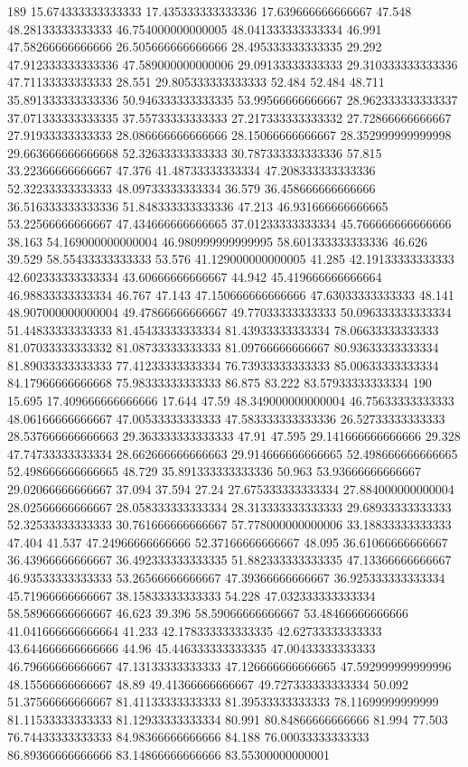189 15.674333333333333 17.435333333333336 17.639666666666667 47.548 48.28133333333333 46.754000000000005 48.041333333333334 46.991 47.58266666666666 26.505666666666666 28.495333333333335 29.292 47.912333333333336 47.589000000000006 29.09133333333333 29.310333333333336 47.71133333333333 28.551 29.805333333333333 52.484 52.484 48.711 35.891333333333336 50.946333333333335 53.99566666666667 28.962333333333337 37.071333333333335 37.55733333333333 27.217333333333332 27.72866666666667 27.91933333333333 28.086666666666666 28.15066666666667 28.352999999999998 29.663666666666668 52.32633333333333 30.787333333333336 57.815 33.22366666666667 47.376 41.48733333333334 47.208333333333336 52.32233333333333 48.09733333333334 36.579 36.458666666666666 36.516333333333336 51.848333333333336 47.213 46.931666666666665 53.22566666666667 47.434666666666665 37.01233333333334 45.766666666666666 38.163 54.169000000000004 46.980999999999995 58.601333333333336 46.626 39.529 58.55433333333333 53.576 41.129000000000005 41.285 42.19133333333333 42.602333333333334 43.60666666666667 44.942 45.419666666666664 46.98833333333334 46.767 47.143 47.150666666666666 47.63033333333333 48.141 48.907000000000004 49.47866666666667 49.77033333333333 50.096333333333334 51.44833333333333 81.45433333333334 81.43933333333334 78.06633333333333 81.07033333333332 81.08733333333333 81.09766666666667 80.93633333333334 81.89033333333333 77.41233333333334 76.73933333333333 85.00633333333334 84.17966666666668 75.98333333333333 86.875 83.222 83.57933333333334
190 15.695 17.409666666666666 17.644 47.59 48.349000000000004 46.75633333333333 48.06166666666667 47.00533333333333 47.583333333333336 26.52733333333333 28.537666666666663 29.363333333333333 47.91 47.595 29.141666666666666 29.328 47.74733333333334 28.662666666666663 29.914666666666665 52.498666666666665 52.498666666666665 48.729 35.891333333333336 50.963 53.93666666666667 29.02066666666667 37.094 37.594 27.24 27.675333333333334 27.884000000000004 28.02566666666667 28.058333333333334 28.313333333333333 29.68933333333333 52.32533333333333 30.761666666666667 57.778000000000006 33.18833333333333 47.404 41.537 47.24966666666666 52.37166666666667 48.095 36.61066666666667 36.43966666666667 36.492333333333335 51.882333333333335 47.13366666666667 46.93533333333333 53.26566666666667 47.39366666666667 36.925333333333334 45.71966666666667 38.15833333333333 54.228 47.032333333333334 58.58966666666667 46.623 39.396 58.59066666666667 53.48466666666666 41.041666666666664 41.233 42.178333333333335 42.62733333333333 43.644666666666666 44.96 45.446333333333335 47.00433333333333 46.79666666666667 47.13133333333333 47.126666666666665 47.592999999999996 48.15566666666667 48.89 49.41366666666667 49.727333333333334 50.092 51.37566666666667 81.41133333333333 81.39533333333333 78.11699999999999 81.11533333333333 81.12933333333334 80.991 80.84866666666666 81.994 77.503 76.74433333333333 84.98366666666666 84.188 76.00033333333333 86.89366666666666 83.14866666666666 83.55300000000001
